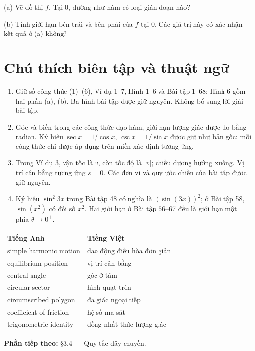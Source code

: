 \documentclass[12pt,a4paper]{article}
\begin{document}
(a) Vẽ đồ thị $f$. Tại 0, dường như hàm có loại gián đoạn nào?

(b) Tính giới hạn bên trái và bên phải của $f$ tại 0. Các giá trị này có xác nhận kết quả ở (a) không?
\section*{Chú thích biên tập và thuật ngữ}
\begin{enumerate}[leftmargin=*]
\item Giữ số công thức (1)–(6), Ví dụ 1–7, Hình 1–6 và Bài tập 1–68; Hình 6 gồm hai phần (a), (b). Ba hình bài tập được giữ nguyên. Không bổ sung lời giải bài tập.
\item Góc và biến trong các công thức đạo hàm, giới hạn lượng giác được đo bằng radian. Ký hiệu $\sec x=1/\cos x$, $\csc x=1/\sin x$ được giữ như bản gốc; mỗi công thức chỉ được áp dụng trên miền xác định tương ứng.
\item Trong Ví dụ 3, vận tốc là $v$, còn tốc độ là $|v|$; chiều dương hướng xuống. Vị trí cân bằng tương ứng $s=0$. Các đơn vị và quy ước chiều của bài tập được giữ nguyên.
\item Ký hiệu $\sin^2 3x$ trong Bài tập 48 có nghĩa là $(\sin(3x))^2$; ở Bài tập 58, $\sin(x^2)$ có đối số $x^2$. Hai giới hạn ở Bài tập 66–67 đều là giới hạn một phía $\theta\to0^+$.
\end{enumerate}
\begin{center}\begin{tabular}{ll}\toprule
Tiếng Anh&Tiếng Việt\\\midrule
simple harmonic motion&dao động điều hòa đơn giản\\
equilibrium position&vị trí cân bằng\\
central angle&góc ở tâm\\
circular sector&hình quạt tròn\\
circumscribed polygon&đa giác ngoại tiếp\\
coefficient of friction&hệ số ma sát\\
trigonometric identity&đồng nhất thức lượng giác\\\bottomrule
\end{tabular}\end{center}
\noindent\textbf{Phần tiếp theo:} §3.4 — Quy tắc dây chuyền.
\end{document}
